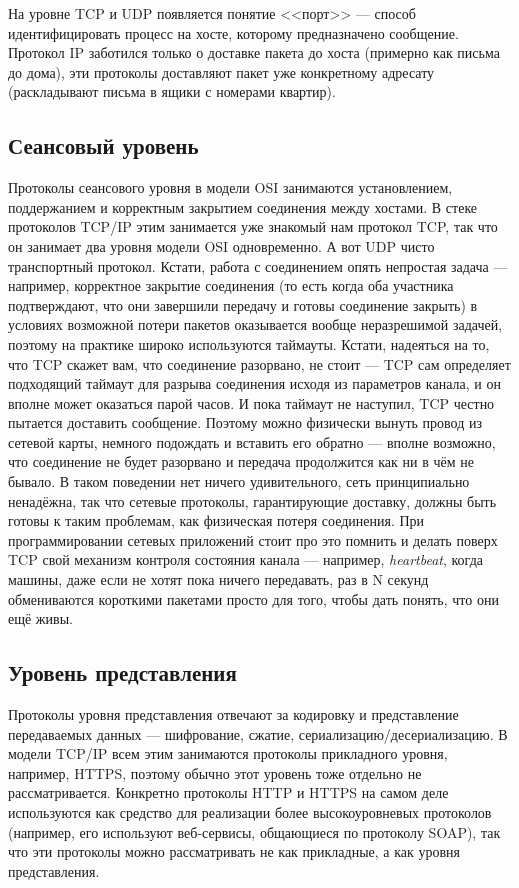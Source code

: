 \documentclass[a5paper]{article}
\begin{document}
На уровне TCP и UDP появляется понятие <<порт>> --- способ идентифицировать процесс на хосте, которому предназначено сообщение. Протокол IP заботился только о доставке пакета до хоста (примерно как письма до дома), эти протоколы доставляют пакет уже конкретному адресату (раскладывают письма в ящики с номерами квартир).

\subsection{Сеансовый уровень}

Протоколы сеансового уровня в модели OSI занимаются установлением, поддержанием и корректным закрытием соединения между хостами. В стеке протоколов TCP/IP этим занимается уже знакомый нам протокол TCP, так что он занимает два уровня модели OSI одновременно. А вот UDP чисто транспортный протокол. Кстати, работа с соединением опять непростая задача --- например, корректное закрытие соединения (то есть когда оба участника подтверждают, что они завершили передачу и готовы соединение закрыть) в условиях возможной потери пакетов оказывается вообще неразрешимой задачей, поэтому на практике широко используются таймауты. Кстати, надеяться на то, что TCP скажет вам, что соединение разорвано, не стоит --- TCP сам определяет подходящий таймаут для разрыва соединения исходя из параметров канала, и он вполне может оказаться парой часов. И пока таймаут не наступил, TCP честно пытается доставить сообщение. Поэтому можно физически вынуть провод из сетевой карты, немного подождать и вставить его обратно --- вполне возможно, что соединение не будет разорвано и передача продолжится как ни в чём не бывало. В таком поведении нет ничего удивительного, сеть принципиально ненадёжна, так что сетевые протоколы, гарантирующие доставку, должны быть готовы к таким проблемам, как физическая потеря соединения. При программировании сетевых приложений стоит про это помнить и делать поверх TCP свой механизм контроля состояния канала --- например, \textit{heartbeat}, когда машины, даже если не хотят пока ничего передавать, раз в N секунд обмениваются короткими пакетами просто для того, чтобы дать понять, что они ещё живы.

\subsection{Уровень представления}

Протоколы уровня представления отвечают за кодировку и представление передаваемых данных --- шифрование, сжатие, сериализацию/десериализацию. В модели TCP/IP всем этим занимаются протоколы прикладного уровня, например, HTTPS, поэтому обычно этот уровень тоже отдельно не рассматривается. Конкретно протоколы HTTP и HTTPS на самом деле используются как средство для реализации более высокоуровневых протоколов (например, его используют веб-сервисы, общающиеся по протоколу SOAP), так что эти протоколы можно рассматривать не как прикладные, а как уровня представления.
\end{document}
